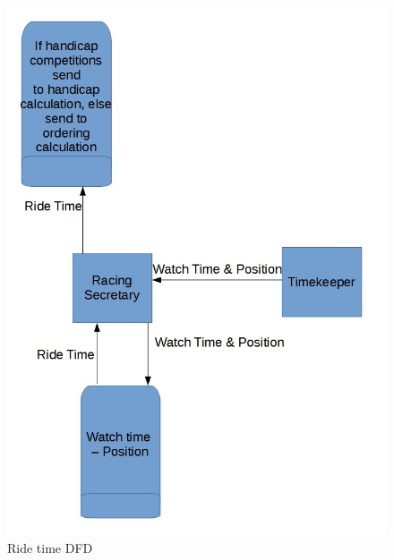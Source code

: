 \begin{figure}[H]
    \includegraphics[width=\textwidth]{./DFD/Done/JPG/RideTimeDFD.jpg}
    \caption{Ride time DFD} \label{fig:Ride time calculation DFD}
\end{figure}

